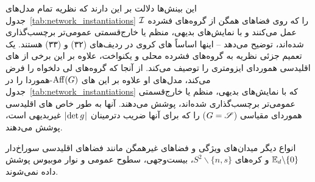 این بینش‌ها دلالت بر این دارند که نظریه \citet{Kondor2018-GENERAL} تمام مدل‌های جدول~\ref{tab:network_instantiations} را که روی فضاهای همگن از گروه‌های فشرده $\mathcal{I}$ عمل می‌کنند و با نمایش‌های بدیهی، منظم یا خارج‌قسمتی عمومی‌تر برچسب‌گذاری شده‌اند، توضیح می‌دهد -- اینها اساساً های کروی در ردیف‌های (۳۲) و (۳۳) هستند.
یک تعمیم جزئی نظریه به گروه‌های فشرده محلی و یکنواخت، علاوه بر این برخی از های اقلیدسی هموردای ایزومتری را توصیف می‌کند.
از آنجا که \citet{bekkers2020bspline} گروه‌های لی دلخواه را فرض می‌کند، مدل‌های او علاوه بر این های $\operatorname{Aff}(G)$-هموردا را در جدول~\ref{tab:network_instantiations} که با نمایش‌های بدیهی، منظم یا خارج‌قسمتی عمومی‌تر برچسب‌گذاری شده‌اند، پوشش می‌دهند.
آنها به طور خاص های اقلیدسی هموردای مقیاسی ($G=\mathscr{S}$) را که برای آنها ضریب دترمینان $|\mkern-2mu \det g \mkern1mu|$ غیربدیهی است، پوشش می‌دهند.


انواع دیگر میدان‌های ویژگی و فضاهای غیرهمگن مانند فضاهای اقلیدسی سوراخ‌دار $\mathbb{E}_d\backslash\{0\}$ و کره‌های $S^2\backslash\{n,s\}$، بیست‌وجهی، سطوح عمومی و نوار موبیوس پوشش داده نمی‌شوند.